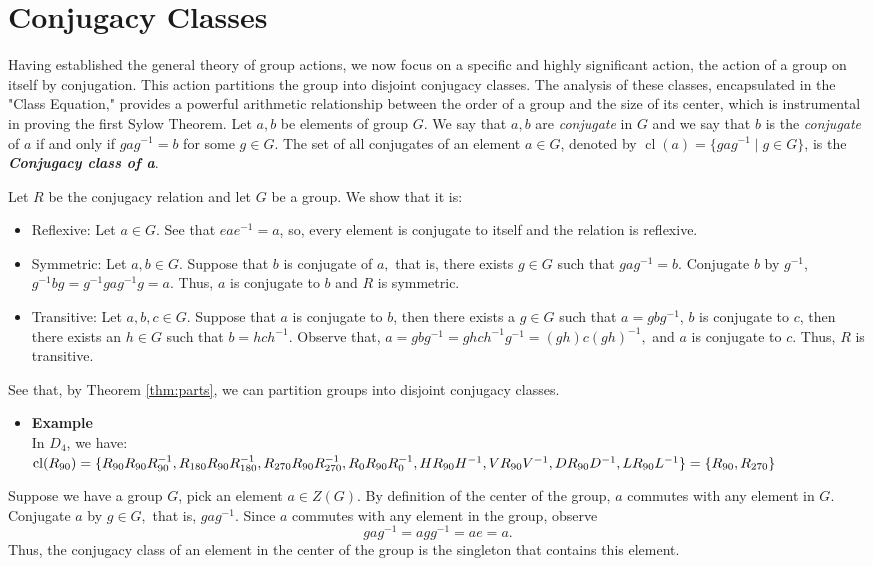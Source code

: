 \documentclass[a4paper,12pt]{article}
\begin{document}
\section{Conjugacy Classes}
Having established the general theory of group actions, we now focus on a specific and highly significant action, the action of a group on itself by conjugation.
This action partitions the group into disjoint conjugacy classes.
The analysis of these classes, encapsulated in the "Class Equation," provides a powerful arithmetic relationship between the order of a group and the size of its center, which is instrumental in proving the first Sylow Theorem.
{
    Let $a,b$ be elements of group $G$. We say that $a,b$ are \textit{conjugate} in $G$ and we say that $b$ is the \textit{conjugate} of $a$ if and only if $gag^{-1}=b$ for some $g \in G.$ The set of all conjugates of an element $a \in G$, denoted by $\operatorname{cl}(a)=\{gag^{-1} \mid g \in G\}$, is the \textbf{\textit{Conjugacy class of a}}.
}
{
    Let $R$ be the conjugacy relation and let $G$ be a group.  We show that it is:
    \begin{itemize}
        \item Reflexive: Let $a\in G$. See that $eae^{-1}=a$, so, every element is conjugate to itself and the relation is reflexive.
        \item Symmetric: Let $a,b\in G$. Suppose that $b$ is conjugate of $a,$ that is, there exists $g\in G$ such that $gag^{-1}=b$. Conjugate $b$ by $g^{-1}$, $g^{-1}bg=g^{-1}gag^{-1}g=a.$ Thus, $a$ is conjugate to $b$ and $R$ is symmetric.
        \item Transitive: Let $a,b,c\in G$. Suppose that $a$ is conjugate to $b$, then there exists a $g \in G$ such that $a=gbg^{-1}$, $b$ is conjugate to $c$, then there exists an $h \in G$ such that $b=hch^{-1}.$ Observe that, $a=gbg^{-1}=ghch^{-1}g^{-1}=(gh)c(gh)^{-1},$ and $a$ is conjugate to $c$. Thus, $R$ is transitive.
    \end{itemize}
}
See that, by Theorem \ref{thm:parts}, we can partition groups into disjoint conjugacy classes.
\begin{itemize}
    \item \textbf{Example}\\
In $D_4$, we have:\\
$\operatorname{cl}(R_{90})=\{R_{90}R_{90}R_{90}^{-1},R_{180}R_{90}R_{180}^{-1},R_{270}R_{90}R_{270}^{-1},R_{0}R_{90}R_{0}^{-1},\\ HR_{90}H^{-1},VR_{90}V^{-1},DR_{90}D^{-1},LR_{90}L^{-1}\}=\{R_{90},R_{270} \}$

\end{itemize}
{
    Suppose we have a group $G$, pick an element $a \in Z(G).$ By definition of the center of the group, $a$ commutes with any element in $G.$ Conjugate $a$ by $g\in G,$ that is, $gag^{-1}$. Since $a$ commutes with any element in the group, observe
    \[gag^{-1}=agg^{-1}=ae=a.\]
    Thus, the conjugacy class of an element in the center of the group is the singleton that contains this element.
} 
\end{document}
